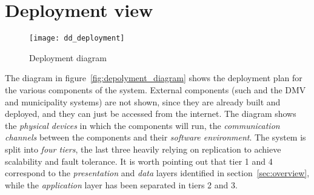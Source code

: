 \section{Deployment view}
\label{sec:deployment_view}
\begin{figure}[ht]
    \centering
    \texttt{[image: dd\_deployment]}
    \caption{Deployment diagram}
    \label{fig:depolyment_diagram}
\end{figure}

The diagram in figure~\vref{fig:depolyment_diagram} shows the deployment plan
for the various components of the system. External components (such and the DMV
and municipality systems) are not shown, since they are already built and
deployed, and they can just be accessed from the internet.
The diagram shows the \emph{physical devices} in which the components will run,
the \emph{communication channels} between the components and their
\emph{software environment}.
The system is split into \emph{four tiers}, the last three heavily relying on
replication to achieve scalability and fault tolerance. It is worth pointing out
that tier 1 and 4 correspond to the \emph{presentation} and \emph{data} layers
identified in section~\ref{sec:overview}, while the \emph{application} layer
has been separated in tiers 2 and 3.

